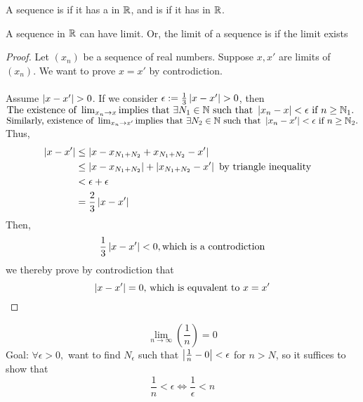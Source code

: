 \documentclass[a4paper,12pt]{article}
\begin{document}
\begin{definition}
    A sequence is  if it has a  in \(\mathbb{R}\), and is  if it 
    has  in $\mathbb{R}$.\\
\end{definition}

\newpage
\begin{theorem}
    A sequence in $\mathbb{R}$ can have  limit. Or, the limit of a sequence is  if the limit exists 
\end{theorem}
\begin{proof}
    Let \((x_n)\) be a sequence of real numbers. Suppose \(x,x'\) are limits of \((x_n)\). We want to prove \(x = x'\) by controdiction.
    \\\\Assume \(\left\lvert x-x'\right\rvert > 0\). If we consider \(\epsilon := \frac{1}{3}\left\lvert x-x'\right\rvert>0\), then\\
    \indent \(\text{The existence of } \lim_{x_n \to x}\text{implies that } \exists N_1 \in \mathbb{N} \text{ such that } \left\lvert x_n-x\right\rvert < \epsilon\text{ if }n\ge \mathbb{N}_1. \)\\
    \indent \(\text{Similarly, existence of } \lim_{x_n \to x'} \text{implies that } \exists N_2 \in \mathbb{N} \text{ such that } \left\lvert x_n-x'\right\rvert < \epsilon\text{ if }n\ge \mathbb{N}_2. \)\\
    Thus,
    \begin{align*}
        \left\lvert x-x'\right\rvert & \le \left\lvert x-x_{N_1+N_2}+x_{N_1+N_2}-x'\right\rvert & \\
                   & \le \left\lvert x-x_{N_1+N_2}\right\rvert+\left\lvert x_{N_1+N_2}-x'\right\rvert \text{ by triangle inequality}\\
                   & < \epsilon+\epsilon \\
                   & = \frac{2}{3}\left\lvert x-x'\right\rvert
    \end{align*}
    Then, 
    \[\frac{1}{3}\left\lvert x-x'\right\rvert<0,\text{which is a controdiction}\]
    we thereby prove by controdiction that
    \[\left\lvert x-x'\right\rvert = 0\text{, which is equvalent to } x=x'\]
\end{proof}

\begin{example}
    \[\lim_{n\to \infty}(\frac{1}{n}) = 0\]
    Goal: \(\forall \epsilon>0,\) want to find \(N_\epsilon\) such that \(\left\lvert \frac{1}{n}-0\right\rvert < \epsilon\) for \(n>N\), 
    so it suffices to show that \\
    \[\frac{1}{n}<\epsilon \Leftrightarrow \frac{1}{\epsilon} < n\]
\end{example}
\end{document}

